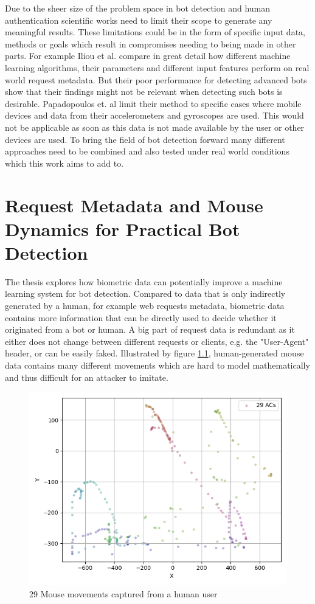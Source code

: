 \documentclass[
    fontsize=12pt,
    headings=small,
    parskip=half,           %
    bibliography=totoc,
    numbers=noenddot,       %
    open=any,               %
    final,                   %
    table
]{scrreprt}
\begin{document}
Due to the sheer size of the problem space in bot detection and human authentication scientific works need to limit their scope to generate any meaningful results. These limitations could be in the form of specific input data, methods or goals which result in compromises needing to being made in other parts. For example Iliou et al. \cite{10.1145/3339252.3339267} compare in great detail how different machine learning algorithms, their parameters and different input features perform on real world request metadata. But their poor performance for detecting advanced bots show that their findings might not be relevant when detecting such bots is desirable. Papadopoulos et. al \cite{PETS2021} limit their method to specific cases where mobile devices and data from their accelerometers and gyroscopes are used. This would not be applicable as soon as this data is not made available by the user or other devices are used. To bring the field of bot detection forward many different approaches need to be combined and also tested under real world conditions which this work aims to add to.


\chapter{Request Metadata and Mouse Dynamics for Practical Bot Detection}

The thesis explores how biometric data can potentially improve a machine learning system for bot detection. Compared to data that is only indirectly generated by a human, for example web requests metadata, biometric data contains more information that can be directly used to decide whether it originated from a bot or human. A big part of request data is redundant as it either does not change between different requests or clients, e.g. the "User-Agent" header, or can be easily faked. Illustrated by figure \ref{fig:user_mouse_heatmap}, human-generated mouse data contains many different movements which are hard to model mathematically and thus difficult for an attacker to imitate.

\begin{figure}[h]
    \includegraphics[width=\textwidth]{figures/user_mouse_heatmap.png}
    \caption{29 Mouse movements captured from a human user}
    \label{fig:user_mouse_heatmap}
\end{figure}
\end{document}
